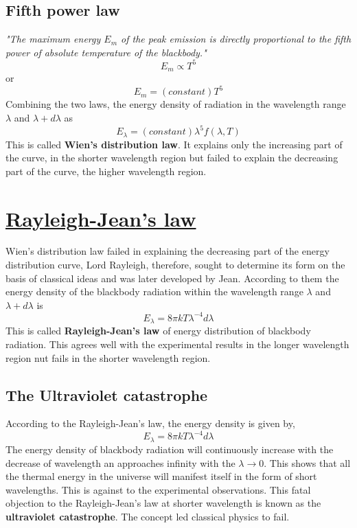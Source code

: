 \documentclass[14pt,a4paper]{article}
\begin{document}
    \subsection{\textbf{Fifth power law}}  \textit{"The maximum energy $E_{m}$ of the peak emission is directly proportional to the fifth power of absolute temperature of the blackbody."}
    \begin{equation*}
        E_{m} \propto T^{5}
    \end{equation*}
    or
    \begin{equation}
        E_{m} = (constant)T^{5}
    \end{equation}
Combining the two laws, the energy density of radiation in the wavelength range $\lambda$ and $\lambda+d\lambda$ as
    \begin{equation}
        E_{\lambda} = (constant)\lambda^{5} f(\lambda,T) 
    \end{equation}
This is called \textbf{Wien's distribution law}. It explains only the increasing part of the curve, in the shorter wavelength region but failed to explain the decreasing part of the curve, the higher wavelength region.

\section{\underline{Rayleigh-Jean's law}} 
Wien's distribution law failed in explaining the decreasing part of the energy distribution curve, Lord Rayleigh, therefore, sought to determine its form on the basis of classical ideas and was later developed by Jean. According to them the energy  density of the blackbody radiation within the wavelength range $\lambda$ and $\lambda+d\lambda$ is 
\begin{equation}
    E_{\lambda} = 8\pi kT\lambda^{-4}d\lambda
\end{equation}
This is called \textbf{Rayleigh-Jean's law} of energy distribution of blackbody radiation. This agrees well with the experimental results in the longer wavelength region nut fails in the shorter wavelength region.
\subsection{The Ultraviolet catastrophe}
According to the Rayleigh-Jean's law, the energy density is given by,
\begin{equation*}
    E_{\lambda} = 8\pi kT\lambda^{-4}d\lambda
\end{equation*}
The energy density of blackbody radiation will continuously increase with the decrease of wavelength an approaches infinity with the $\lambda \rightarrow 0 $. This shows that all the thermal energy in the universe will manifest itself in the form of short wavelengths. This is against to the experimental observations. This fatal objection to the Rayleigh-Jean's law at shorter wavelength is known as the \textbf{ultraviolet catastrophe}. The concept led classical physics to fail.
\newpage
\end{document}
